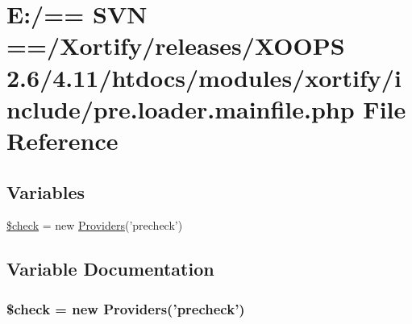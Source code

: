 \hypertarget{pre_8loader_8mainfile_8php}{\section{E\-:/== S\-V\-N ==/\-Xortify/releases/\-X\-O\-O\-P\-S 2.6/4.11/htdocs/modules/xortify/include/pre.loader.\-mainfile.\-php File Reference}
\label{pre_8loader_8mainfile_8php}
}
\subsection*{Variables}
\begin{DoxyCompactItemize}
\item 
\hyperlink{pre_8loader_8mainfile_8php_a830cf70d25fefacddcf4c6bc3fd7a0e0}{\$check} = new \hyperlink{class_providers}{Providers}('precheck')
\end{DoxyCompactItemize}


\subsection{Variable Documentation}
\hypertarget{pre_8loader_8mainfile_8php_a830cf70d25fefacddcf4c6bc3fd7a0e0}{
\subsubsection[{\$check}]{\setlength{\rightskip}{0pt plus 5cm}\$check = new {\bf Providers}('precheck')}}\label{pre_8loader_8mainfile_8php_a830cf70d25fefacddcf4c6bc3fd7a0e0}
